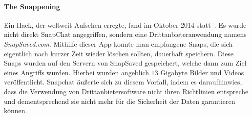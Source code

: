 \paragraph{The Snappening} Ein Hack, der weltweit Aufsehen erregte, fand
im Oktober 2014 statt~\cite{sc_snappening}. Es wurde nicht direkt SnapChat
angegriffen, sondern eine Drittanbieteranwendung namens \emph{SnapSaved.com}.
Mithilfe dieser App konnte man empfangene Snaps, die sich eigentlich nach
kurzer Zeit wieder l\"oschen sollten, dauerhaft speichern. Diese Snaps wurden
auf den Servern von SnapSaved gespeichert, welche dann zum Ziel eines Angriffs
wurden. Hierbei wurden angeblich $13$ Gigabyte\cite{sc_snappening} Bilder und
Videos ver\"offentlicht. Snapchat \"au{\ss}erte sich zu diesem Vorfall, indem
es daraufhinwies, dass die Verwendung von Drittanbietersoftware nicht ihren
Richtlinien entspreche und dementsprechend sie nicht mehr f\"ur die Sicherheit
der Daten garantieren k\"onnen.
